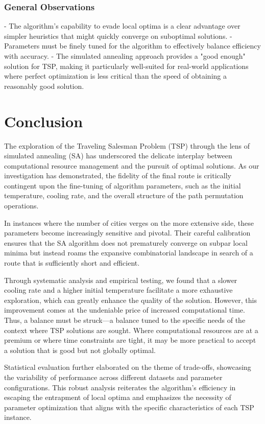 \documentclass[a4paper,10pt]{article}
\begin{document}
\subsubsection{General Observations}
- The algorithm's capability to evade local optima is a clear advantage over simpler heuristics that might quickly converge on suboptimal solutions.
- Parameters must be finely tuned for the algorithm to effectively balance efficiency with accuracy.
- The simulated annealing approach provides a "good enough" solution for TSP, making it particularly well-suited for real-world applications where perfect optimization is less critical than the speed of obtaining a reasonably good solution.

\section{Conclusion}

The exploration of the Traveling Salesman Problem (TSP) through the lens of simulated annealing (SA) has underscored the delicate interplay between computational resource management and the pursuit of optimal solutions. As our investigation has demonstrated, the fidelity of the final route is critically contingent upon the fine-tuning of algorithm parameters, such as the initial temperature, cooling rate, and the overall structure of the path permutation operations.

In instances where the number of cities verges on the more extensive side, these parameters become increasingly sensitive and pivotal. Their careful calibration ensures that the SA algorithm does not prematurely converge on subpar local minima but instead roams the expansive combinatorial landscape in search of a route that is sufficiently short and efficient.

Through systematic analysis and empirical testing, we found that a slower cooling rate and a higher initial temperature facilitate a more exhaustive exploration, which can greatly enhance the quality of the solution. However, this improvement comes at the undeniable price of increased computational time. Thus, a balance must be struck—a balance tuned to the specific needs of the context where TSP solutions are sought. Where computational resources are at a premium or where time constraints are tight, it may be more practical to accept a solution that is good but not globally optimal.

Statistical evaluation further elaborated on the theme of trade-offs, showcasing the variability of performance across different datasets and parameter configurations. This robust analysis reiterates the algorithm's efficiency in escaping the entrapment of local optima and emphasizes the necessity of parameter optimization that aligns with the specific characteristics of each TSP instance.
\end{document}
